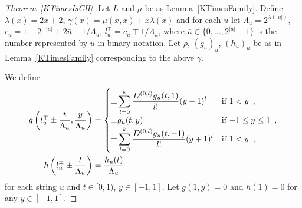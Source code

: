 \begin{proof}[Theorem~\ref{KTimesIsCH}]
Let $L$ and $\mu$ be as Lemma~\ref{KTimesFamily}.
Define
$
  \lambda(x) = 2x + 2
$, $
  \gamma(x) = \mu(x, x) + x \lambda(x)
$
and for each $u$ let
$
 \Lambda_u = 2^{\lambda(|u|)}
$, $
 c_u = 1-{2^{-|u|}}+{2\bar{u}+1}/{\Lambda_u}
$, $
 l_u^\mp = c_u\mp{1}/{\Lambda_u}
$,
 where $\bar u \in \{0, \dots, 2^{|u|} - 1\}$ is the number represented by $u$ in binary notation.
Let $\rho$, $(g_u)_u$, $(h_u)_u$ be as in Lemma~\ref{KTimesFamily} 
corresponding to the above $\gamma$.

We define
 \begin{align} \label{eq:g}
 g \left(l^\mp_u \pm \frac{t}{\Lambda_u}, \frac{y}{\Lambda_u}\right)
  &= \begin{cases}
      \pm \displaystyle \sum_{l=0}^k \frac{D^{(0,l)}g_u(t,1)}{l!} (y-1)^l 
      &  \text{if} \ 1<y \enspace , \\
      \pm g_u(t, y)      & \text{if} \ {-1} \le y \le 1 \enspace , \\
      \pm \displaystyle \sum_{l=0}^k \frac{D^{(0,l)}g_u(t,-1)}{l!} (y+1)^l  
      &  \text{if} \ 1<y \enspace , \\
    \end{cases} 
  \\
 h \left( l^\mp_u \pm \frac{t}{\Lambda_u} \right) 
  & = \frac{h_u(t)}{\Lambda_u}
\end{align}
for each string $u$ and $t \in [0,1)$, $y \in [-1, 1]$.
Let $g(1,y) = 0$ and $h(1) = 0$ for any $y \in [-1,1]$.


\end{proof}
